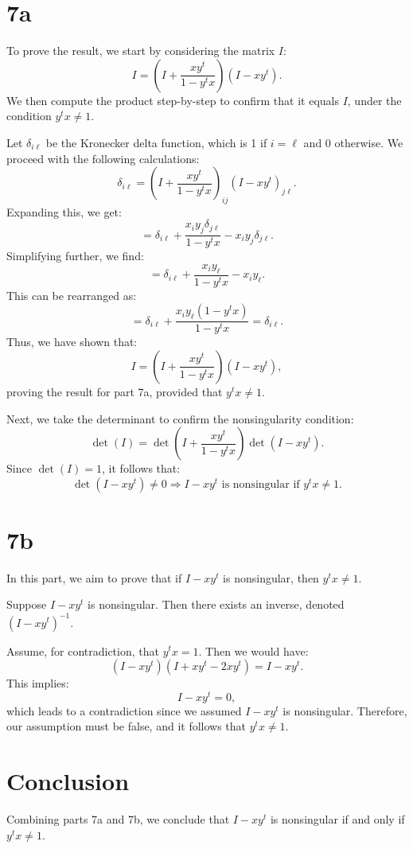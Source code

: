 \documentclass{article}
\begin{document}

\section*{7a}

To prove the result, we start by considering the matrix \( I \):
\[
I = \left( I + \frac{xy^t}{1 - y^t x} \right) (I - xy^t).
\]
We then compute the product step-by-step to confirm that it equals \( I \), under the condition \( y^t x \neq 1 \).

Let \( \delta_{i \ell} \) be the Kronecker delta function, which is 1 if \( i = \ell \) and 0 otherwise. We proceed with the following calculations:
\[
\delta_{i \ell} = \left( I + \frac{xy^t}{1 - y^t x} \right)_{ij} (I - xy^t)_{j \ell}.
\]
Expanding this, we get:
\[
= \delta_{i \ell} + \frac{x_i y_j \delta_{j \ell}}{1 - y^t x} - x_i y_j \delta_{j \ell}.
\]
Simplifying further, we find:
\[
= \delta_{i \ell} + \frac{x_i y_\ell}{1 - y^t x} - x_i y_\ell.
\]
This can be rearranged as:
\[
= \delta_{i \ell} + \frac{x_i y_\ell (1 - y^t x)}{1 - y^t x} = \delta_{i \ell}.
\]
Thus, we have shown that:
\[
I = \left( I + \frac{xy^t}{1 - y^t x} \right) (I - xy^t),
\]
proving the result for part 7a, provided that \( y^t x \neq 1 \).

Next, we take the determinant to confirm the nonsingularity condition:
\[
\det \left( I \right) = \det \left( I + \frac{xy^t}{1 - y^t x} \right) \det \left( I - xy^t \right).
\]
Since \( \det(I) = 1 \), it follows that:
\[
\det(I - xy^t) \neq 0 \Rightarrow I - xy^t \text{ is nonsingular if } y^t x \neq 1.
\]

\section*{7b}

In this part, we aim to prove that if \( I - xy^t \) is nonsingular, then \( y^t x \neq 1 \).

Suppose \( I - xy^t \) is nonsingular. Then there exists an inverse, denoted \( (I - xy^t)^{-1} \).

Assume, for contradiction, that \( y^t x = 1 \). Then we would have:
\[
(I - xy^t)(I + xy^t - 2xy^t) = I - xy^t.
\]
This implies:
\[
I - xy^t = 0,
\]
which leads to a contradiction since we assumed \( I - xy^t \) is nonsingular. Therefore, our assumption must be false, and it follows that \( y^t x \neq 1 \).

\section*{Conclusion}

Combining parts 7a and 7b, we conclude that \( I - xy^t \) is nonsingular if and only if \( y^t x \neq 1 \).
\end{document}
